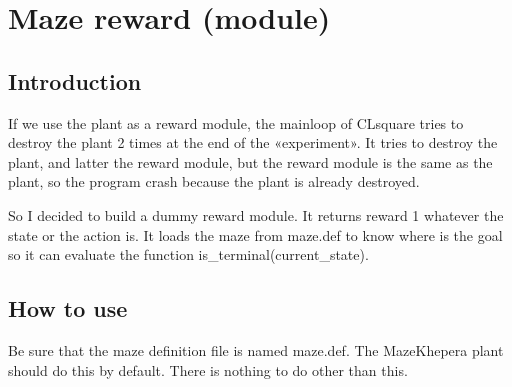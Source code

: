 \section{Maze reward (module)}

\subsection{Introduction}

If we use the plant as a reward module, the mainloop of CLsquare tries to 
destroy 
the plant 2 times at the end of the «experiment». It tries to destroy 
the plant, and latter the reward module, but the reward module is the 
same as the plant, so the program crash because the plant is already 
destroyed. 

So I decided to build a dummy reward module. It returns reward 1 
whatever the state or the action is. It loads the maze from maze.def 
to know where is the goal so it can evaluate the function 
is\_terminal(current\_state).

\subsection{How to use}

Be sure that the maze definition file is named maze.def. The MazeKhepera
plant should do this by default. There is nothing to do other than this.
